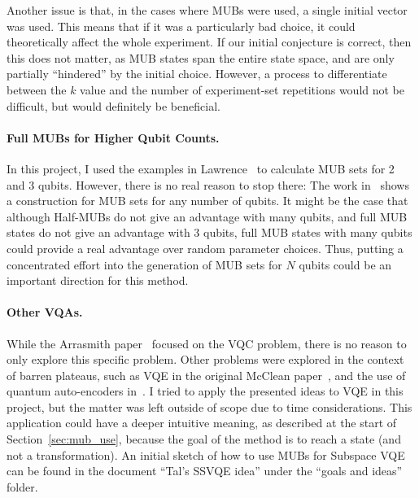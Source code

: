 \documentclass[a4paper,12pt]{article}
\begin{document}
Another issue is that, in the cases where MUBs were used, a single initial vector was used.
This means that if it was a particularly bad choice, it could theoretically affect the whole experiment.
If our initial conjecture is correct, then this does not matter, as MUB states span the entire state space, and are only partially ``hindered'' by the initial choice.
However, a process to differentiate between the $k$ value and the number of experiment-set repetitions would not be difficult, but would definitely be beneficial.

\paragraph*{Full MUBs for Higher Qubit Counts.}
In this project, I used the examples in Lawrence~\cite{lawrence_mutually_2002} to calculate MUB sets for 2 and 3 qubits. However, there is no real reason to stop there: The work in~\cite{bandyopadhyay_new_2002} shows a construction for MUB sets for any number of qubits.
It might be the case that although Half-MUBs do not give an advantage with many qubits, and full MUB states do not give an advantage with 3 qubits, full MUB states with many qubits could provide a real advantage over random parameter choices.
Thus, putting a concentrated effort into the generation of MUB sets for $N$ qubits could be an important direction for this method.

\paragraph*{Other VQAs.}
While the Arrasmith paper~\cite{arrasmith_effect_2021} focused on the VQC problem, there is no reason to only explore this specific problem.
Other problems were explored in the context of barren plateaus, such as VQE in the original McClean paper~\cite{mcclean_barren_2018}, and the use of quantum auto-encoders in~\cite{cerezo_cost_2021}.
I tried to apply the presented ideas to VQE in this project, but the matter was left outside of scope due to time considerations. This application could have a deeper intuitive meaning, as described at the start of Section~\ref{sec:mub_use}, because the goal of the method is to reach a state (and not a transformation).
An initial sketch of how to use MUBs for Subspace VQE \cite{nakanishi_subspace-search_2019} can be found in the document ``Tal's SSVQE idea'' under the ``goals and ideas'' folder.
\end{document}
